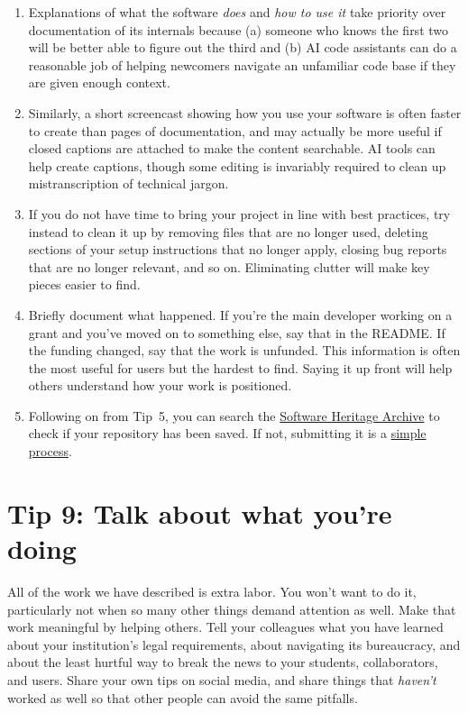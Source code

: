 \documentclass[10pt,letterpaper]{article}
\begin{document}
\begin{enumerate}

\item
  Explanations of what the software \emph{does} and \emph{how to use it}
  take priority over documentation of its internals
  because (a) someone who knows the first two will be better able to figure out the third
  and (b) AI code assistants can do a reasonable job of helping newcomers navigate an unfamiliar code base
  if they are given enough context.

\item
  Similarly,
  a short screencast showing how you use your software
  is often faster to create than pages of documentation,
  and may actually be more useful if closed captions are attached
  to make the content searchable.
  AI tools can help create captions,
  though some editing is invariably required to clean up mistranscription of technical jargon.

\item
  If you do not have time to bring your project in line with best practices,
  try instead to clean it up by removing files that are no longer used,
  deleting sections of your setup instructions that no longer apply,
  closing bug reports that are no longer relevant,
  and so on.
  Eliminating clutter will make key pieces easier to find.

\item
  Briefly document what happened.
  If you're the main developer working on a grant and you've moved on to something else,
  say that in the README.
  If the funding changed, say that the work is unfunded.
  This information is often the most useful for users but the hardest to find.
  Saying it up front will help others understand how your work is positioned.

  \item
    Following on from Tip~5,
    you can search the \href{https://archive.softwareheritage.org/browse/search/}{Software Heritage Archive}
    to check if your repository has been saved.
    If not,
    submitting it is a \href{https://archive.softwareheritage.org/save/}{simple process}.

\end{enumerate}

\section*{Tip 9: Talk about what you're doing}

All of the work we have described is extra labor.
You won't want to do it,
particularly not when so many other things demand attention as well.
Make that work meaningful by helping others.
Tell your colleagues what you have learned about your institution's legal requirements,
about navigating its bureaucracy,
and about the least hurtful way to break the news to your students, collaborators, and users.
Share your own tips on social media,
and share things that \emph{haven't} worked as well
so that other people can avoid the same pitfalls.
\end{document}
